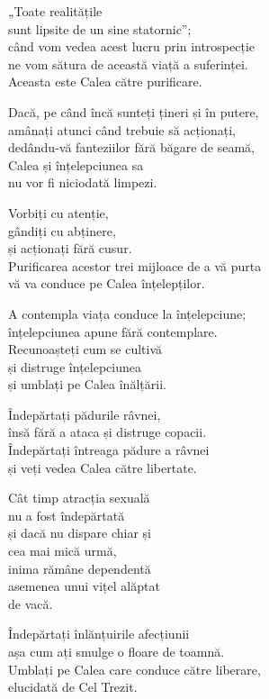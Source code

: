 „Toate realitățile\\
sunt lipsite de un sine statornic”;\\
când vom vedea acest lucru prin introspecție\\
ne vom sătura de această viață a suferinței.\\
Aceasta este Calea către purificare.


Dacă, pe când încă sunteți țineri și în putere,\\
amânați atunci când trebuie să acționați,\\
dedându-vă fanteziilor fără băgare de seamă,\\
Calea și înțelepciunea sa\\
nu vor fi niciodată limpezi.


Vorbiți cu atenție,\\
gândiți cu abținere,\\
și acționați fără cusur.\\
Purificarea acestor trei mijloace de a vă purta\\
vă va conduce pe Calea înțelepților.


A contempla viața conduce la înțelepciune;\\
înțelepciunea apune fără contemplare.\\
Recunoașteți cum se cultivă\\
și distruge înțelepciunea\\
și umblați pe Calea înălțării.


Îndepărtați pădurile râvnei,\\
însă fără a ataca și distruge copacii.\\
Îndepărtați întreaga pădure a râvnei\\
și veți vedea Calea către libertate.


Cât timp atracția sexuală\\
nu a fost îndepărtată\\
și dacă nu dispare chiar și\\
cea mai mică urmă,\\
inima rămâne dependentă\\
asemenea unui vițel alăptat\\
de vacă.


Îndepărtați înlănțuirile afecțiunii\\
așa cum ați smulge o floare de toamnă.\\
Umblați pe Calea care conduce către liberare,\\
elucidată de Cel Trezit.


